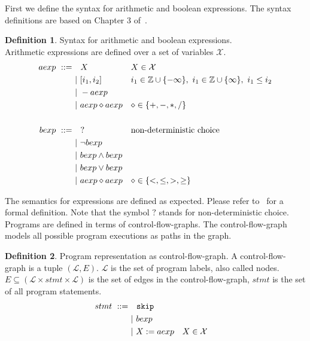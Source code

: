 \documentclass[11pt,a4paper,titlepage]{article}
\theoremstyle{definition}
\newtheorem{definition}{Definition}[section]
\begin{document}
First we define the syntax for arithmetic and boolean expressions. 
The syntax definitions are based on Chapter 3 of~\cite{UrbanPhd}.

\begin{definition}\label{def:arith_bool_syntax}
    Syntax for arithmetic and boolean expressions. \\
    Arithmetic expressions are defined over a set of variables $\mathcal{X}$.
    \begin{align*}
        \setlength{\jot}{15pt}
        aexp \ ::= \ & \ \ X && X \in \mathcal{X} \\
        &| \  [i_1, i_2] && i_1 \in \mathbb{Z} \cup \{ -\infty \},\ i_1 \in \mathbb{Z} \cup \{\infty \},\ i_1 \leq i_2  \\
        &| \  - aexp \\
        &| \  aexp \diamond aexp && \diamond \in \{ +, -, *, / \}\\
        \\
        bexp \ ::= \ & \ \ ?  && \text{non-deterministic choice} \\
        &| \  \neg bexp \\
        &| \  bexp \land bexp \\
        &| \  bexp \lor bexp \\
        &| \  aexp \diamond aexp && \diamond \in \{<, \leq, >, \geq \}\\
    \end{align*}
\end{definition}

The semantics for expressions are defined as expected. 
Please refer to~\cite{UrbanPhd} for a formal definition. 
Note that the symbol $?$ stands for non-deterministic choice.\\

Programs are defined in terms of control-flow-graphs. The control-flow-graph models all possible program executions as
paths in the graph.

\begin{definition}\label{def:control_flow_graph}
    Program representation as control-flow-graph. 
    A control-flow-graph is a tuple $(\mathcal{L}, E)$.
    $\mathcal{L}$ is the set of program labels, also called nodes. 
    $E \subseteq (\mathcal{L} \times stmt \times \mathcal{L})$ is the set of edges in the control-flow-graph,
    $stmt$ is the set of all program statements.
    \begin{align*}
        \setlength{\jot}{15pt}
        stmt \ ::= \ & \ \ \mathtt{skip} \\
        &| \ bexp \\
        &| \ X := aexp  && X \in \mathcal{X} \\
    \end{align*}
\end{definition}
\end{document}
